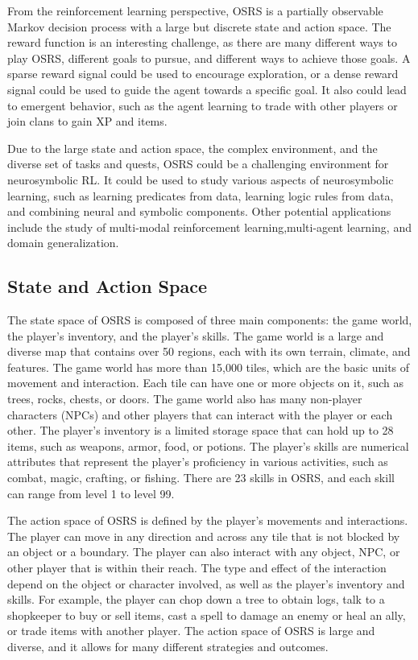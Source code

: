 \documentclass{article}
\begin{document}
From the reinforcement learning perspective, OSRS is a partially observable Markov decision process with a large but discrete state and action space. The reward function is an interesting challenge, as there are many different ways to play OSRS, different goals to pursue, and different ways to achieve those goals. A sparse reward signal could be used to encourage exploration, or a dense reward signal could be used to guide the agent towards a specific goal. It also could lead to emergent behavior, such as the agent learning to trade with other players or join clans to gain XP and items.

Due to the large state and action space, the complex environment, and the diverse set of tasks and quests, OSRS could be a challenging environment for neurosymbolic RL. It could be used to study various aspects of neurosymbolic learning, such as learning predicates from data, learning logic rules from data, and combining neural and symbolic components. Other potential applications include the study of multi-modal reinforcement learning,multi-agent learning, and domain generalization.

\subsection{State and Action Space}
The state space of OSRS is composed of three main components: the game world, the player's inventory, and the player's skills. The game world is a large and diverse map that contains over 50 regions, each with its own terrain, climate, and features. The game world has more than 15,000 tiles, which are the basic units of movement and interaction. Each tile can have one or more objects on it, such as trees, rocks, chests, or doors. The game world also has many non-player characters (NPCs) and other players that can interact with the player or each other. The player's inventory is a limited storage space that can hold up to 28 items, such as weapons, armor, food, or potions. The player's skills are numerical attributes that represent the player's proficiency in various activities, such as combat, magic, crafting, or fishing. There are 23 skills in OSRS, and each skill can range from level 1 to level 99.

The action space of OSRS is defined by the player's movements and interactions. The player can move in any direction and across any tile that is not blocked by an object or a boundary. The player can also interact with any object, NPC, or other player that is within their reach. The type and effect of the interaction depend on the object or character involved, as well as the player's inventory and skills. For example, the player can chop down a tree to obtain logs, talk to a shopkeeper to buy or sell items, cast a spell to damage an enemy or heal an ally, or trade items with another player. The action space of OSRS is large and diverse, and it allows for many different strategies and outcomes.
\end{document}

